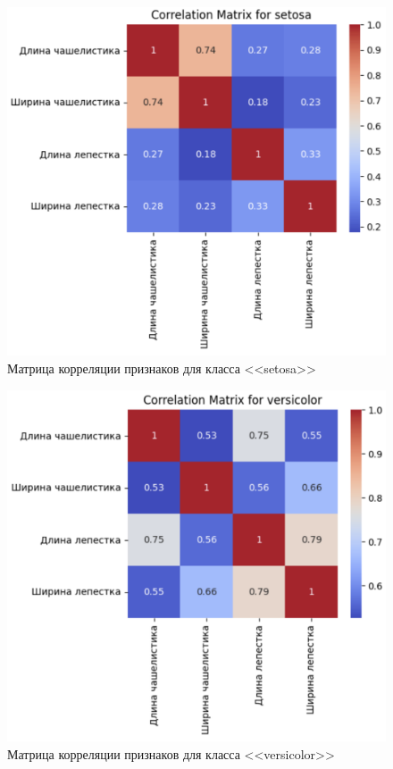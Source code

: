 \begin{figure}
	\begin{center}
		\includegraphics[width=\textwidth]{images/5.png}
	\end{center}
	\caption{Матрица корреляции признаков для класса <<setosa>>}
	\label{img:5}
\end{figure}

\begin{figure}
	\begin{center}
		\includegraphics[width=\textwidth]{images/6.png}
	\end{center}
	\caption{Матрица корреляции признаков для класса <<versicolor>>}
	\label{img:6}
\end{figure}

